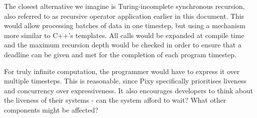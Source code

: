\documentclass{scrartcl}
\begin{document}
    The closest alternative we imagine is Turing-incomplete synchronous recursion, also referred to as recursive operator application earlier in this document. This would allow processing batches of data in one timestep, but using a mechanism more similar to C++'s templates. All calls would be expanded at compile time and the maximum recursion depth would be checked in order to ensure that a deadline can be given and met for the completion of each program timestep.
    
    For truly infinite computation, the programmer would have to express it over multiple timesteps. This is reasonable, since Pixy specifically prioritises liveness and concurrency over expressiveness. It also encourages developers to think about the liveness of their systems - can the system afford to wait? What other components might be affected?
    
\end{document}
